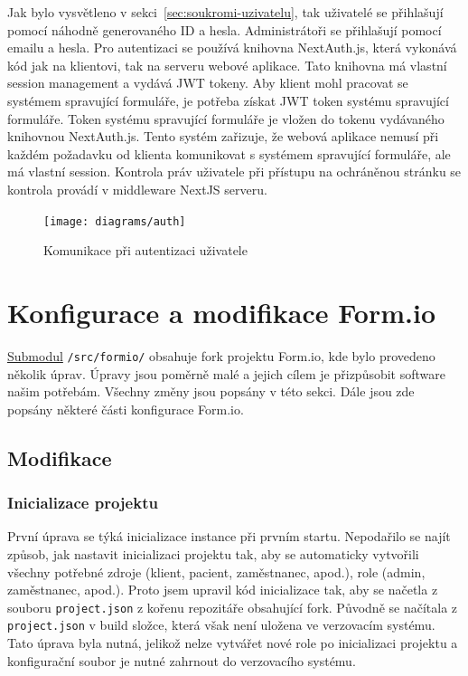 Jak bylo vysvětleno v sekci~\ref{sec:soukromi-uzivatelu}, tak uživatelé se přihlašují pomocí náhodně generovaného ID a hesla.
Administrátoři se přihlašují pomocí emailu a hesla.
Pro autentizaci se používá knihovna NextAuth.js, která vykonává kód jak na klientovi, tak na serveru webové aplikace.
Tato knihovna má vlastní session management a vydává JWT tokeny.
Aby klient mohl pracovat se systémem spravující formuláře, je potřeba získat JWT token systému spravující formuláře.
Token systému spravující formuláře je vložen do tokenu vydávaného knihovnou NextAuth.js.
Tento systém zařizuje, že webová aplikace nemusí při každém požadavku od klienta komunikovat s systémem spravující formuláře, ale má vlastní session.
Kontrola práv uživatele při přístupu na ochráněnou stránku se kontrola provádí v middleware NextJS serveru.

\begin{figure}[H]
    \centering
    \texttt{[image: diagrams/auth]}
    \caption{Komunikace při autentizaci uživatele}\label{fig:auth}
\end{figure}


\section{Konfigurace a modifikace Form.io}\label{sec:konfigurace-a-modifikace-form.io}

\href{https://git-scm.com/book/en/v2/Git-Tools-Submodules}{Submodul} \texttt{/src/formio/} obsahuje fork projektu Form.io, kde bylo provedeno několik úprav.
Úpravy jsou poměrně malé a jejich cílem je přizpůsobit software našim potřebám.
Všechny změny jsou popsány v této sekci.
Dále jsou zde popsány některé části konfigurace Form.io.

\subsection{Modifikace}\label{subsec:modifikace}

\subsubsection{Inicializace projektu}\label{subsubsec:inicializace-projektu}

První úprava se týká inicializace instance při prvním startu.
Nepodařilo se najít způsob, jak nastavit inicializaci projektu tak, aby se automaticky vytvořili všechny potřebné zdroje (klient, pacient, zaměstnanec, apod.), role (admin, zaměstnanec, apod.).
Proto jsem upravil kód inicializace tak, aby se načetla z souboru \texttt{project.json} z kořenu repozitáře obsahující fork.
Původně se načítala z \texttt{project.json} v build složce, která však není uložena ve verzovacím systému.
Tato úprava byla nutná, jelikož nelze vytvářet nové role po inicializaci projektu a konfigurační soubor je nutné zahrnout do verzovacího systému.

